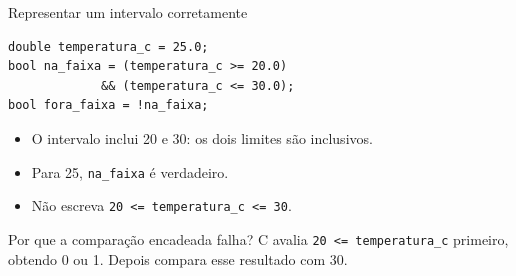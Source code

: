 \begin{frame}[fragile]{Representar um intervalo corretamente}
\begin{lstlisting}
double temperatura_c = 25.0;
bool na_faixa = (temperatura_c >= 20.0)
             && (temperatura_c <= 30.0);
bool fora_faixa = !na_faixa;
\end{lstlisting}
\begin{itemize}
\item O intervalo inclui 20 e 30: os dois limites são inclusivos.
\item Para 25, \texttt{na\_faixa} é verdadeiro.
\item Não escreva \texttt{20 <= temperatura\_c <= 30}.
\end{itemize}
\begin{alertblock}{Por que a comparação encadeada falha?}
C avalia \texttt{20 <= temperatura\_c} primeiro, obtendo 0 ou 1. Depois compara esse resultado com 30.
\end{alertblock}
\end{frame}
